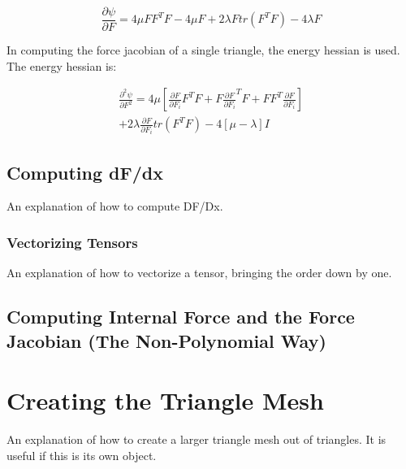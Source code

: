 \documentclass[twocolumn,10pt]{asme2ej}
\begin{document}
\begin{equation}
\frac{\partial \psi}{\partial F} = 4\mu FF^TF - 4\mu F + 2\lambda Ftr(F^TF) -4\lambda F
\label{eq_pk1}
\end{equation}

In computing the force jacobian of a single triangle, the energy hessian is used. The energy hessian is:

\begin{equation}
  \begin{split}
\frac{\partial^2 \psi}{\partial F^2} = 4\mu [\frac{\partial F}{\partial F_i}F^TF + F\frac{\partial F}{\partial F_i}^TF + FF^T\frac{\partial F}{\partial F_i}] \\ + 2\lambda \frac{\partial F}{\partial F_i}tr(F^TF) - 4[\mu -\lambda]I
  \end{split}
\label{eq_dpdf}
\end{equation}

\subsection{Computing dF/dx}

An explanation of how to compute DF/Dx.

\subsubsection{Vectorizing Tensors}

An explanation of how to vectorize a tensor, bringing the order down by one.

\subsection{Computing Internal Force and the Force Jacobian (The Non-Polynomial Way)}


\section{Creating the Triangle Mesh}

An explanation of how to create a larger triangle mesh out of triangles. It is useful if this is its own
object.
\end{document}
